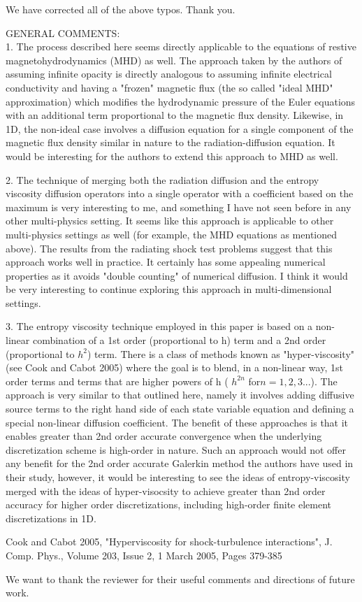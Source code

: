 \documentclass{article}
\begin{document}
We have corrected all of the above typos. Thank you.
\bigskip


{
\color{blue}
\noindent
GENERAL COMMENTS: \\
1. The process described here seems directly applicable to the equations of restive magnetohydrodynamics (MHD) as well. The approach taken by the authors of assuming infinite opacity is directly analogous to assuming infinite electrical conductivity and having a "frozen" magnetic flux (the so called "ideal MHD" approximation) which modifies the hydrodynamic pressure of the Euler equations with an additional term proportional to the magnetic flux density. Likewise, in 1D, the non-ideal case involves a diffusion equation for a single component of the magnetic flux density similar in nature to the radiation-diffusion equation. It would be interesting for the authors to extend this approach to MHD as well.}
\bigskip


{
\color{blue}
2. The technique of merging both the radiation diffusion and the entropy viscosity diffusion operators into a single operator with a coefficient based on the maximum is very interesting to me, and something I have not seen before in any other multi-physics setting. It seems like this approach is applicable to other multi-physics settings as well (for example, the MHD equations as mentioned above). The results from the radiating shock test problems suggest that this approach works well in practice. It certainly has some appealing numerical properties as it avoids "double counting" of numerical diffusion. I think it would be very interesting to continue exploring this approach in multi-dimensional settings.
}
\bigskip


{
\color{blue}
3. The entropy viscosity technique employed in this paper is based on a non-linear combination of a 1st order (proportional to h) term and a 2nd order (proportional to $h^2$) term. There is a class of methods known as "hyper-viscosity" (see Cook and Cabot 2005) where the goal is to blend, in a non-linear way, 1st order terms and terms that are higher powers of h ( $h^{2n}$ for$ n = 1,2,3$...). The approach is very similar to that outlined here, namely it involves adding diffusive source terms to the right hand side of each state variable equation and defining a special non-linear diffusion coefficient. The benefit of these approaches is that it enables greater than 2nd order accurate convergence when the underlying discretization scheme is high-order in nature. Such an approach would not offer any benefit for the 2nd order accurate Galerkin method the authors have used in their study, however, it would be interesting to see the ideas of entropy-viscosity merged with the ideas of
hyper-visocsity to achieve greater than 2nd order accuracy for higher order discretizations, including high-order finite element discretizations in 1D.

Cook and Cabot 2005, "Hyperviscosity for shock-turbulence interactions", J. Comp. Phys., Volume 203, Issue 2, 1 March 2005, Pages 379-385
}
\bigskip

We want to thank the reviewer for their useful comments and directions of future work.
\end{document}
